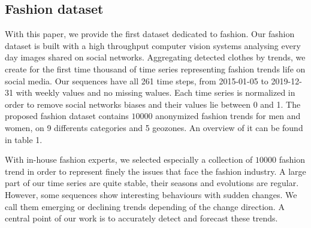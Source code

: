 \documentclass{article} %
\newcommand{\numberts}{10000}
\begin{document}

\subsection{Fashion dataset}

With this paper, we provide the first dataset dedicated to fashion. Our fashion dataset is built with a high throughput computer vision systems analysing every day images shared on social networks. Aggregating detected clothes by trends, we create for the first time thousand of time series representing fashion trends life on social media. Our sequences have all 261 time steps, from 2015-01-05 to 2019-12-31 with weekly values and no missing walues. Each time series is normalized in order to remove social networks biases and their values lie between 0 and 1. The proposed fashion dataset contains $\numberts$ anonymized fashion trends for men and women, on 9 differents categories and 5 geozones. An overview of it can be found in table 1.

With in-house fashion experts, we selected especially a collection of $\numberts$ fashion trend in order to represent finely the issues that face the fashion industry. A large part of our time series are quite stable, their seasons and evolutions are regular. However, some sequences show interesting behaviours with sudden changes. We call them emerging or declining trends depending of the change direction. A central point of our work is to accurately detect and forecast these trends.



\end{document}

